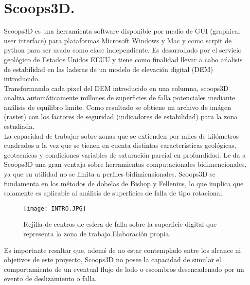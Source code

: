 \chapter{Scoops3D.}
Scoops3D es una herramienta software disponible por medio de GUI (graphical user interface) para plataformas Microsoft Windows y Mac  y como scrpit de python para ser usado como clase independiente. Es desarrollado por el servicio geol\'ogico de Estados Unidos EEUU y tiene como finalidad llevar a cabo a\'nalisis de estabilidad en las laderas de un modelo de elevaci\'on digital (DEM) introducido.\\

Transformando cada pixel del DEM introducido en una columna, scoops3D analiza autom\'aticamente millones de superficies de falla potenciales mediante an\'alisis de equilibro limite.  Como resultado se obtiene un archivo de im\'agen (raster) con los factores de seguridad (indicadores de estabilidad) para la zona estudiada.\\

La capacidad de trabajar sobre zonas que se extienden por miles de kil\'ometros cuadrados a la vez que se tienen en cuenta distintas caracter\'isticas geol\'ogicas, geotecnicas y condiciones variables de saturaci\'on parcial en profundidad. Le da a Scoops3D una gran ventaja sobre herramientas computacionales  bidimencionales, ya que su utilidad no se limita a perfiles bidimiensionales.
Scoops3D se fundamenta en los m\'etodos de dobelas de Bishop y Fellenius, lo que implica que solamente es aplicable al an\'alisis de superficies de falla de tipo rotacional.

\begin{figure}[H]
\centering
\texttt{[image: INTRO.JPG]}
\caption{Rejilla de centros de esfera de falla sobre la superficie digital que representa la zona de trabajo.Elaboraci\'on propia.}
\end{figure}
Es importante resaltar que, adem\'s de no estar contemplado entre los alcance ni objetivos de este proyecto, Scoops3D no posee la capacidad de simular el comportamiento de un eventual flujo de lodo o escombros desencadenado por un evento de deslizamiento o falla. 
